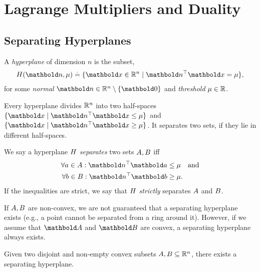 
\chapter{Lagrange Multipliers and Duality}\label{cha:lagrange_multipliers_duality}

\section{Separating Hyperplanes}

\begin{defn}[Hyperplane] A \emph{hyperplane} of dimension $n$ is the subset, \begin{align}
    \sH(\vn,\mu) \defeq \{\vx \in \R^n \mid \trans{\vn}\vx = \mu\},
\end{align} for some \emph{normal} $\vn \in \R^n \setminus \{\vZero\}$ and \emph{threshold} $\mu \in \mathbb{R}$.
\end{defn}

Every hyperplane divides $\mathbb{R}^n$ into two half-spaces $\{\vx \mid \trans{\vn}\vx \leq \mu\}$ and $\{\vx \mid \trans{\vn}\vx \geq \mu\}$. It separates two sets, if they lie in different half-spaces.

\begin{defn} We say a hyperplane $H$ \emph{separates} two sets $A, B$ iff \begin{align}\begin{split}
    \forall a \in \sA: \trans{\vn}\va &\leq \mu \quad\text{and} \\
    \forall b \in \sB: \trans{\vn}\vb &\geq \mu.
\end{split}\end{align} If the inequalities are strict, we say that $H$ \emph{strictly} separates $A$ and $B$.
\end{defn}

If $A, B$ are non-convex, we are not guaranteed that a separating hyperplane exists (e.g., a point cannot be separated from a ring around it). However, if we assume that $\mA$ and $\mB$ are convex, a separating hyperplane always exists.

\begin{fct} Given two disjoint and non-empty convex subsets $A, B \subseteq \mathbb{R}^n$, there exists a separating hyperplane.
\end{fct}

